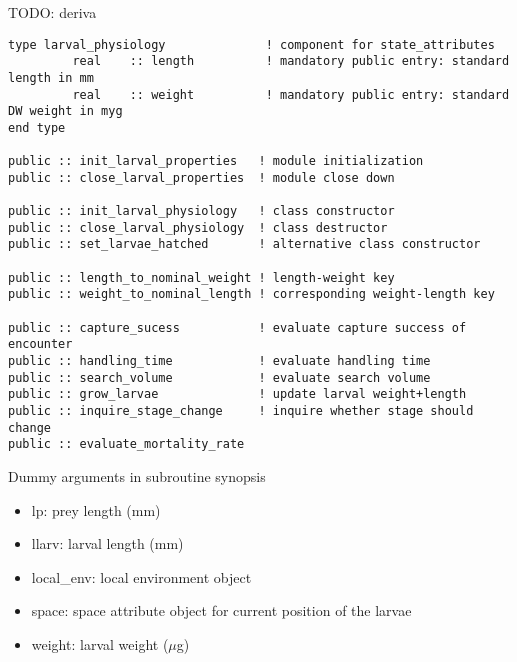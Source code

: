 TODO: deriva


\begin{verbatim}
type larval_physiology              ! component for state_attributes
         real    :: length          ! mandatory public entry: standard length in mm 
         real    :: weight          ! mandatory public entry: standard DW weight in myg 
end type

public :: init_larval_properties   ! module initialization
public :: close_larval_properties  ! module close down

public :: init_larval_physiology   ! class constructor
public :: close_larval_physiology  ! class destructor
public :: set_larvae_hatched       ! alternative class constructor

public :: length_to_nominal_weight ! length-weight key
public :: weight_to_nominal_length ! corresponding weight-length key
             
public :: capture_sucess           ! evaluate capture success of encounter 
public :: handling_time            ! evaluate handling time 
public :: search_volume            ! evaluate search volume            
public :: grow_larvae              ! update larval weight+length
public :: inquire_stage_change     ! inquire whether stage should change
public :: evaluate_mortality_rate  
\end{verbatim}

Dummy arguments in subroutine synopsis
\begin{itemize}
  \item lp: prey length (mm)
  \item llarv: larval length (mm)  
  \item local\_env: local environment object
  \item space: space attribute object for current position of the larvae
  \item weight:  larval weight ($\mu$g)
\end{itemize}    

